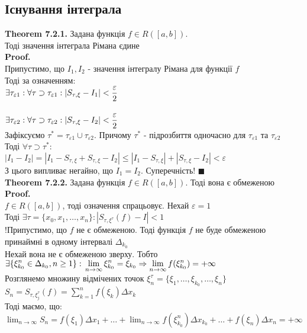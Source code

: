 \documentclass[a4paper, 14pt]{extarticle}
\def\huge{\displaystyle}
\def\bigline{\vspace{5mm}\\}
\def\th#1{\textbf{Theorem {#1}}}
\def\proof{\textbf{Proof.}\\}
\def\bigline{\vspace{5mm}\\}
\def\qed{$\blacksquare$}
\begin{document}
\subsection{Існування інтеграла}
\th{7.2.1.} Задана функція $f \in R([a,b])$. \\ Тоді значення інтеграла Рімана єдине\\
\proof
Припустимо, що $I_1,I_2$ - значення інтегралу Рімана для функції $f$\\
Тоді за означенням:\\
$\exists \tau_{\varepsilon 1}: \forall \tau \supset \tau_{\varepsilon 1}: \abs{S_{\tau, \xi} - I_1} < \dfrac{\varepsilon}{2}$\\
\vspace{0.2cm}\\
$\exists \tau_{\varepsilon 2}: \forall \tau \supset \tau_{\varepsilon 2}: \abs{S_{\tau, \xi} - I_2} < \dfrac{\varepsilon}{2}$\\
Зафіксуємо $\tau^* = \tau_{\varepsilon 1} \cup \tau_{\varepsilon 2}$. Причому $\tau^*$ - підрозбиття одночасно для $\tau_{\varepsilon 1}$ та $\tau_{\varepsilon 2}$\\
Тоді $\forall \tau \supset \tau^*:$\\
$|I_1 - I_2| = |I_1 - S_{\tau,\xi} + S_{\tau,\xi} - I_2| \leq |I_1 - S_{\tau,\xi}| + |S_{\tau,\xi} - I_2| < \varepsilon$\\
З цього випливає негайно, що $I_1 = I_2$. Суперечність! \qed
\bigline
\th{7.2.2.} Задана функція $f \in R([a,b])$. Тоді вона є обмеженою\\
\proof
$f \in R([a,b])$, тоді означення спрацьовує. Нехай $\varepsilon = 1$\\
Тоді $\exists \tau = \{x_0,x_1,\dots,x_n\}: |S_{\tau, \xi^{\tau}}(f) - I| < 1$\\
!Припустимо, що $f$ не є обмеженою. Тоді функція $f$ не буде обмеженою принаймні в одному інтервалі $\Delta_{k_0}$\\
Нехай вона не є обмеженою зверху. Тобто $\huge \exists \{\xi^n_{k_0} \in \Delta_{k_0}, n \geq 1\}: \\ \lim_{n \to \infty} \xi_{k_0}^n = \xi_{k_0} \Rightarrow \lim_{n \to \infty} f(\xi_{k_0}^n) = +\infty$\\
Розглянемо множину відмічених точок $\xi_n^{\tau} = \{\xi_1,\dots, \xi_{k_0}, \dots, \xi_n\}$\\
$S_n = S_{\tau, \xi_j^{\tau}}(f) = \huge \sum_{k=1}^n f(\xi_k) \Delta x_k$\\
Тоді маємо, що:\\
$\huge \lim_{n \to \infty} S_n = f(\xi_1)\Delta x_1 + \dots + \lim_{n \to \infty} f(\xi_{k_0}^n) \Delta x_{k_0} + \dots + f(\xi_n) \Delta x_n = +\infty$\\
\end{document}
